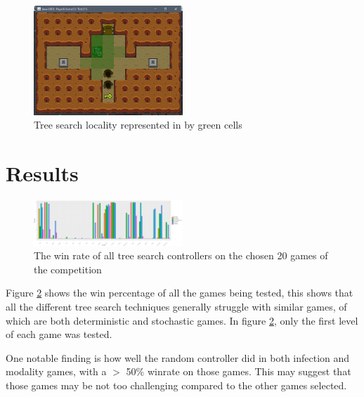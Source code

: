 \documentclass[journal]{IEEEtran}
\begin{document}
	\begin{figure}[h]
		   \centering
		   \includegraphics[width=0.5\textwidth]{BrFS-Locality}
		   \caption{ Tree search locality represented in by green cells }
		   \label{fig:locality}
	\end{figure}





\section{Results}
		\begin{figure}[h]
		    \centering
		    \includegraphics[width=0.5\textwidth]{allGameBarPlot}
		    \caption{ The win rate of all tree search controllers on the chosen 20 games of the competition}
		    \label{fig:allGameBarPlot}
		\end{figure}



		Figure \ref{fig:allGameBarPlot} shows the win percentage of all the games being tested, this shows that all the different tree search techniques generally struggle with similar games, of which are both deterministic and stochastic games.
In figure \ref{fig:allGameBarPlot}, only the first level of each game was tested.

	One notable finding is how well the random controller did in both infection and modality games, with a $>$ 50\% winrate on those games. This may suggest that those games may be not too challenging compared to the other games selected.
\end{document}
